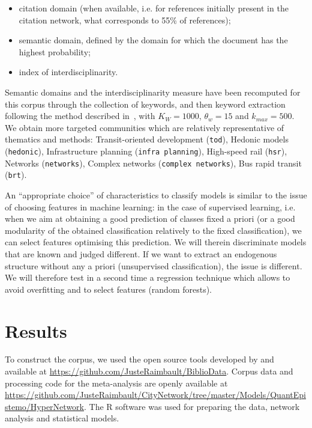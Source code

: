 \documentclass[10pt]{article}
\begin{document}
\begin{itemize}
	\item citation domain (when available, i.e. for references initially present in the citation network, what corresponds to 55\% of references);
	\item semantic domain, defined by the domain for which the document has the highest probability;
	\item index of interdisciplinarity.
\end{itemize}

Semantic domains and the interdisciplinarity measure have been recomputed for this corpus through the collection of keywords, and then keyword extraction following the method described in~\cite{raimbault2019exploration}, with $K_W=1000$, $\theta_w=15$ and $k_{max}=500$. We obtain more targeted communities which are relatively representative of thematics and methods: Transit-oriented development (\texttt{tod}), Hedonic models (\texttt{hedonic}), Infrastructure planning (\texttt{infra planning}), High-speed rail (\texttt{hsr}), Networks (\texttt{networks}), Complex networks (\texttt{complex networks}), Bus rapid transit (\texttt{brt}).

An ``appropriate choice'' of characteristics to classify models is similar to the issue of choosing features in machine learning: in the case of supervised learning, i.e. when we aim at obtaining a good prediction of classes fixed a priori (or a good modularity of the obtained classification relatively to the fixed classification), we can select features optimising this prediction. We will therein discriminate models that are known and judged different. If we want to extract an endogenous structure without any a priori (unsupervised classification), the issue is different. We will therefore test in a second time a regression technique which allows to avoid overfitting and to select features (random forests).




\section{Results}

To construct the corpus, we used the open source tools developed by \cite{raimbault2019exploration} and available at \url{https://github.com/JusteRaimbault/BiblioData}. Corpus data and processing code for the meta-analysis are openly available at \url{https://github.com/JusteRaimbault/CityNetwork/tree/master/Models/QuantEpistemo/HyperNetwork}. The R software was used for preparing the data, network analysis and statistical models.
\end{document}
